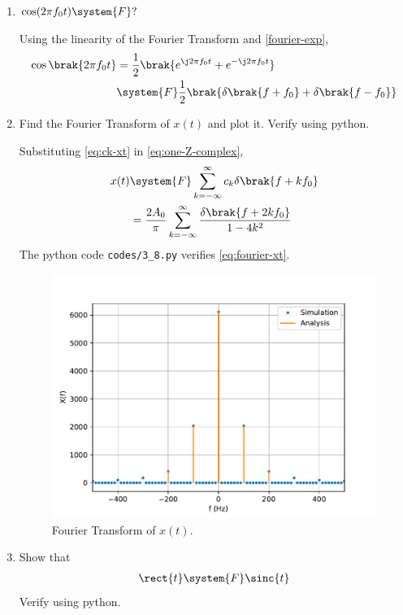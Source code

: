 \documentclass[journal,12pt,twocolumn]{IEEEtran}
\renewcommand\thesection{\arabic{section}}
\begin{document}
\begin{enumerate}[label=\thesection.\arabic*
,ref=\thesection.\theenumi]
\solution Suppose $g(t)\system{F}G(f)$. Then,
\begin{align}
    g(t)e^{\j2\pi f_0t}&\system{F}\int_{-\infty}^{\infty}
                       g(t)e^{-\j2\pi\brak{f-f_0}t}\, dt \\
                       &=F(f-f_0)
                       \label{eq:f-shift}
\end{align}
Using \eqref{eq:duality} in \eqref{eq:fourier-delta}, $1\system{F}\delta(-f)$.
Hence, applying \eqref{eq:f-shift},
\begin{align}
    e^{-\j2\pi f_0t}\system{F}\delta(-(f+f_0)) = \delta(f+f_0)
    \label{eq:fourier-exp}
\end{align}
\item $\cos(2\pi f_0t)\system{F}?$

\solution Using the linearity of the Fourier 
Transform and \eqref{fourier-exp},
\begin{align}
    \cos\brak{2\pi f_0t} &= \frac{1}{2}
                         \brak{e^{\j2\pi f_0t} + e^{-\j2\pi f_0t}} \\
                         &\system{F}\frac{1}{2}\brak{\delta\brak{f+f_0} + \delta\brak{f-f_0}}
\end{align}
\item Find the Fourier Transform of $x(t)$ and plot it. Verify using python.

\solution Substituting \eqref{eq:ck-xt} in \eqref{eq:one-Z-complex},
\begin{align}
    x(t)&\system{F}\sum_{k=-\infty}^{\infty}c_k\delta\brak{f+kf_0} \\
        &=\frac{2A_0}{\pi}\sum_{k=-\infty}^{\infty}\frac{\delta\brak{f+2kf_0}}{1-4k^2}
        \label{eq:fourier-xt}
\end{align}
The python code \texttt{codes/3\_8.py} verifies \eqref{eq:fourier-xt}.
\begin{figure}[!ht]
    \includegraphics[width=\columnwidth]{figs/3_8.pdf}
    \caption{Fourier Transform of $x(t)$.}
    \label{eq:fig-fourier-xt}
\end{figure}
\item Show that
\begin{align}
    \rect{t} \system{F} \sinc{t}
\end{align}
Verify using python.


\end{enumerate}
\end{document}
